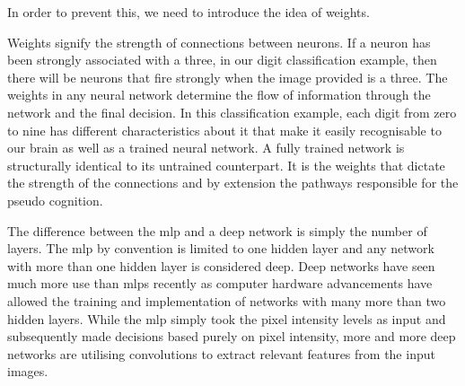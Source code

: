 \documentclass[12pt]{article}
\begin{document}
In order to prevent this, we need to introduce the idea of weights. 
\par 
Weights signify the strength of connections between neurons.
If a neuron has been strongly associated with a three, in our digit classification example, then there will be neurons that fire strongly when the image provided is a three.
The weights in any neural network determine the flow of information through the network and the final decision.
In this classification example, each digit from zero to nine has different characteristics about it that make it easily recognisable to our brain as well as a trained neural network.
A fully trained network is structurally identical to its untrained counterpart. It is the weights that dictate the strength of the connections and by extension the pathways responsible for the pseudo cognition.
\par
The difference between the mlp and a deep network is simply the number of layers.
The mlp by convention is limited to one hidden layer and any network with more than one hidden layer is considered deep.
Deep networks have seen much more use than mlps recently as computer hardware advancements have allowed the training and implementation of networks with many more than two hidden layers.
While the mlp simply took the pixel intensity levels as input and subsequently made decisions based purely on pixel intensity, more and more deep networks are utilising convolutions to extract relevant features from the input images.
\end{document}

